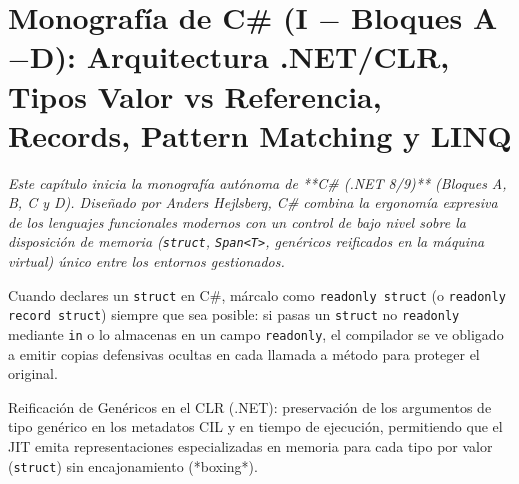 \documentclass{book}
\begin{document}
\chapter{Monografía de C\# (I \(-\) Bloques A\(-\)D): Arquitectura .NET/CLR, Tipos Valor vs Referencia, Records, Pattern Matching y LINQ}
\label{chap:cap01-csharp-dotnet-clr-tipos-valor-referencia-linq}

\noindent\textit{Este capítulo inicia la monografía autónoma de **C\# (.NET 8/9)** (Bloques A, B, C y D). Diseñado por Anders Hejlsberg, C\# combina la ergonomía expresiva de los lenguajes funcionales modernos con un control de bajo nivel sobre la disposición de memoria (\texttt{struct}, \texttt{Span<T>}, genéricos reificados en la máquina virtual) único entre los entornos gestionados.}

\begin{tcolorbox}[title={Consejo}, studiumtip, breakable]

Cuando declares un \texttt{struct} en C\#, márcalo como \texttt{readonly struct} (o \texttt{readonly record struct}) siempre que sea posible: si pasas un \texttt{struct} no \texttt{readonly} mediante \texttt{in} o lo almacenas en un campo \texttt{readonly}, el compilador se ve obligado a emitir copias defensivas ocultas en cada llamada a método para proteger el original.
\end{tcolorbox}

\begin{tcolorbox}[title={Definición}, studiumdef, breakable]

Reificación de Genéricos en el CLR (.NET): preservación de los argumentos de tipo genérico en los metadatos CIL y en tiempo de ejecución, permitiendo que el JIT emita representaciones especializadas en memoria para cada tipo por valor (\texttt{struct}) sin encajonamiento (*boxing*).
\end{tcolorbox}
\end{document}
